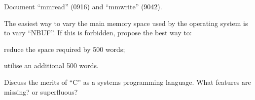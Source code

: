 \item[5.4] Document ``mmread'' (0916) and
``mmwrite'' (9042).
\ed
{}

\bd
\item[6.1] The easiest way to vary the main
memory space used by the operating system is to
vary ``NBUF''. If this is forbidden, propose the best way to:

\bd
\item[(a)] reduce the space required by 500
words;

\item[(b)] utilise an additional 500 words.
\ed

\item[6.2] Discuss the merits of ``C'' as a systems programming language. What
features are missing? or superfluous?
\ed
